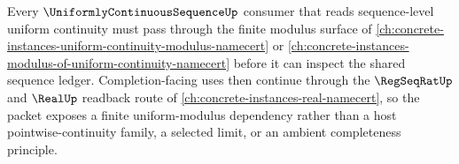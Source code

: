 Every $\UniformlyContinuousSequenceUp$ consumer that reads sequence-level uniform continuity must pass through the finite modulus surface of \autoref{ch:concrete-instances-uniform-continuity-modulus-namecert} or \autoref{ch:concrete-instances-modulus-of-uniform-continuity-namecert} before it can inspect the shared sequence ledger. Completion-facing uses then continue through the $\RegSeqRatUp$ and $\RealUp$ readback route of \autoref{ch:concrete-instances-real-namecert}, so the packet exposes a finite uniform-modulus dependency rather than a host pointwise-continuity family, a selected limit, or an ambient completeness principle.
